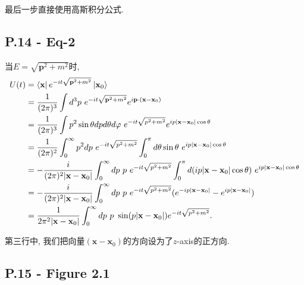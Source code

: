 最后一步直接使用高斯积分公式.


\subsection{P.14 - Eq-2}

当$E = \sqrt{\mathbf{p}^2+m^2}$时,
\begin{equation}
  \begin{aligned}
    U(t) & = \mathinner{\langle \mathbf{x}|}e^{-it\sqrt{\mathbf{p}^2+m^2}}\mathinner{|\mathbf{x}_0\rangle}                                                                                            \\
         & = \frac{1}{(2\pi)^3} \int d^3p \ e^{-it\sqrt{\mathbf{p}^2+m^2}} e^{i\mathbf{p}\cdot(\mathbf{x}-\mathbf{x}_0)}                                                                              \\
         & = \frac{1}{(2\pi)^3} \int p^2\sin\theta dp d\theta d\varphi \ e^{-it\sqrt{p^2+m^2}} e^{ip|\mathbf{x}-\mathbf{x}_0|\cos\theta}                                                              \\
         & = \frac{1}{(2\pi)^2} \int_0^\infty p^2 dp \ e^{-it\sqrt{p^2+m^2}} \int_0^\pi d\theta \sin\theta \ e^{ip|\mathbf{x}-\mathbf{x}_0|\cos\theta}                                                \\
         & = -\frac{i}{(2\pi)^2|\mathbf{x}-\mathbf{x}_0|} \int_0^\infty dp \ p\ e^{-it\sqrt{p^2+m^2}} \int_0^\pi d(ip|\mathbf{x}-\mathbf{x}_0|\cos\theta) \ e^{ip|\mathbf{x}-\mathbf{x}_0|\cos\theta} \\
         & = -\frac{i}{(2\pi)^2|\mathbf{x}-\mathbf{x}_0|} \int_0^\infty dp \ p\ e^{-it\sqrt{p^2+m^2}} (e^{-ip|\mathbf{x}-\mathbf{x}_0|}-e^{ip|\mathbf{x}-\mathbf{x}_0|})                              \\
         & = \frac{1}{2\pi^2|\mathbf{x}-\mathbf{x}_0|} \int_0^\infty dp \ p\ \sin(p|\mathbf{x}-\mathbf{x}_0|) e^{-it\sqrt{p^2+m^2}}.
  \end{aligned}
\end{equation}

第三行中, 我们把向量$(\mathbf{x}-\mathbf{x}_0)$的方向设为了$z$-axis的正方向.

\subsection{P.15 - Figure 2.1}

